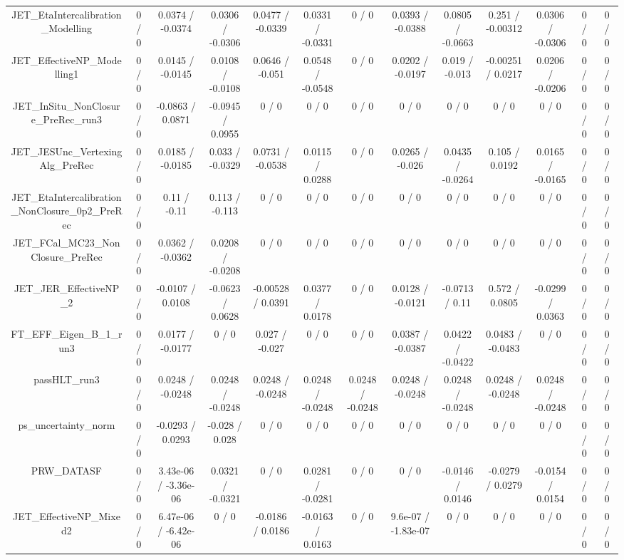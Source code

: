 \documentclass[10pt]{article}
\begin{document}
\begin{table}[htbp]
\begin{center}
\begin{tabular}{|c|c|c|c|c|c|c|c|c|c|c|c|c|}
  JET_EtaIntercalibration_Modelling & 0 / 0 & 0.0374 / -0.0374 & 0.0306 / -0.0306 & 0.0477 / -0.0339 & 0.0331 / -0.0331 & 0 / 0 & 0.0393 / -0.0388 & 0.0805 / -0.0663 & 0.251 / -0.00312 & 0.0306 / -0.0306 & 0 / 0 & 0 / 0 \\ 
  JET_EffectiveNP_Modelling1 & 0 / 0 & 0.0145 / -0.0145 & 0.0108 / -0.0108 & 0.0646 / -0.051 & 0.0548 / -0.0548 & 0 / 0 & 0.0202 / -0.0197 & 0.019 / -0.013 & -0.00251 / 0.0217 & 0.0206 / -0.0206 & 0 / 0 & 0 / 0 \\ 
  JET_InSitu_NonClosure_PreRec_run3 & 0 / 0 & -0.0863 / 0.0871 & -0.0945 / 0.0955 & 0 / 0 & 0 / 0 & 0 / 0 & 0 / 0 & 0 / 0 & 0 / 0 & 0 / 0 & 0 / 0 & 0 / 0 \\ 
  JET_JESUnc_VertexingAlg_PreRec & 0 / 0 & 0.0185 / -0.0185 & 0.033 / -0.0329 & 0.0731 / -0.0538 & 0.0115 / 0.0288 & 0 / 0 & 0.0265 / -0.026 & 0.0435 / -0.0264 & 0.105 / 0.0192 & 0.0165 / -0.0165 & 0 / 0 & 0 / 0 \\ 
  JET_EtaIntercalibration_NonClosure_0p2_PreRec & 0 / 0 & 0.11 / -0.11 & 0.113 / -0.113 & 0 / 0 & 0 / 0 & 0 / 0 & 0 / 0 & 0 / 0 & 0 / 0 & 0 / 0 & 0 / 0 & 0 / 0 \\ 
  JET_FCal_MC23_NonClosure_PreRec & 0 / 0 & 0.0362 / -0.0362 & 0.0208 / -0.0208 & 0 / 0 & 0 / 0 & 0 / 0 & 0 / 0 & 0 / 0 & 0 / 0 & 0 / 0 & 0 / 0 & 0 / 0 \\ 
  JET_JER_EffectiveNP_2 & 0 / 0 & -0.0107 / 0.0108 & -0.0623 / 0.0628 & -0.00528 / 0.0391 & 0.0377 / 0.0178 & 0 / 0 & 0.0128 / -0.0121 & -0.0713 / 0.11 & 0.572 / 0.0805 & -0.0299 / 0.0363 & 0 / 0 & 0 / 0 \\ 
  FT_EFF_Eigen_B_1_run3 & 0 / 0 & 0.0177 / -0.0177 & 0 / 0 & 0.027 / -0.027 & 0 / 0 & 0 / 0 & 0.0387 / -0.0387 & 0.0422 / -0.0422 & 0.0483 / -0.0483 & 0 / 0 & 0 / 0 & 0 / 0 \\ 
  passHLT_run3 & 0 / 0 & 0.0248 / -0.0248 & 0.0248 / -0.0248 & 0.0248 / -0.0248 & 0.0248 / -0.0248 & 0.0248 / -0.0248 & 0.0248 / -0.0248 & 0.0248 / -0.0248 & 0.0248 / -0.0248 & 0.0248 / -0.0248 & 0 / 0 & 0 / 0 \\ 
  ps_uncertainty_norm & 0 / 0 & -0.0293 / 0.0293 & -0.028 / 0.028 & 0 / 0 & 0 / 0 & 0 / 0 & 0 / 0 & 0 / 0 & 0 / 0 & 0 / 0 & 0 / 0 & 0 / 0 \\ 
  PRW_DATASF & 0 / 0 & 3.43e-06 / -3.36e-06 & 0.0321 / -0.0321 & 0 / 0 & 0.0281 / -0.0281 & 0 / 0 & 0 / 0 & -0.0146 / 0.0146 & -0.0279 / 0.0279 & -0.0154 / 0.0154 & 0 / 0 & 0 / 0 \\ 
  JET_EffectiveNP_Mixed2 & 0 / 0 & 6.47e-06 / -6.42e-06 & 0 / 0 & -0.0186 / 0.0186 & -0.0163 / 0.0163 & 0 / 0 & 9.6e-07 / -1.83e-07 & 0 / 0 & 0 / 0 & 0 / 0 & 0 / 0 & 0 / 0 \\ 

\end{tabular}
\end{center}
\end{table}
\end{document}
